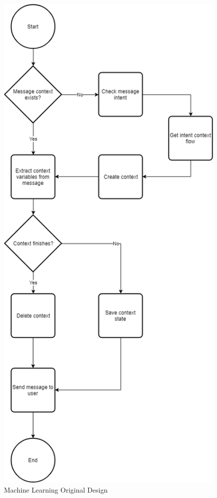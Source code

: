 \begin{center}
	\begin{figure}[h!]
		\centering
		\includegraphics[scale=0.55]{./images/4-machine-learn-ori}
		\caption{Machine Learning Original Design}
		\label{4_machine_learn_ori}
	\end{figure}
\end{center}

